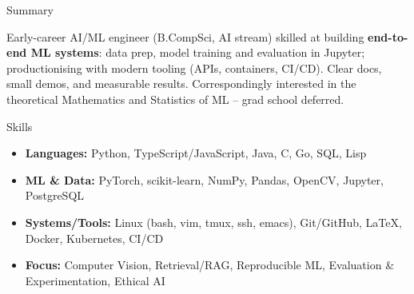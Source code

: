 \documentclass[]{mcdowellcv}
\begin{document}
\setcounter{footnote}{0}
\renewcommand{\thefootnote}{\fnsymbol{footnote}}
\makeheader

\begin{cvsection}{Summary}
  \begin{cvsubsection}{}{}{}
      Early-career AI/ML engineer (B.CompSci, AI stream) skilled at building \textbf{end-to-end ML systems}: data prep, model training and evaluation in Jupyter; productionising with modern tooling (APIs, containers, CI/CD). Clear docs, small demos, and measurable results. Correspondingly interested in the theoretical Mathematics and Statistics of ML -- grad school deferred.
  \end{cvsubsection}
\end{cvsection}

\vspace{-0.3cm}
\begin{cvsection}{Skills}
  \begin{cvsubsection}{}{}{}
    \begin{itemize}
      \item \textbf{Languages:} Python, TypeScript/JavaScript, Java, C, Go, SQL, Lisp
      \item \textbf{ML \& Data:} PyTorch, scikit-learn, NumPy, Pandas, OpenCV, Jupyter, PostgreSQL
      \item \textbf{Systems/Tools:} Linux (bash, vim, tmux, ssh, emacs), Git/GitHub, \LaTeX{}, Docker, Kubernetes, CI/CD
      \item \textbf{Focus:} Computer Vision, Retrieval/RAG, Reproducible ML, Evaluation \& Experimentation, Ethical AI
    \end{itemize}
  \end{cvsubsection}
\end{cvsection}
\end{document}

